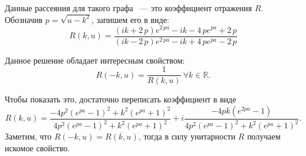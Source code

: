 \documentclass[a4 paper, 12 pt]{extarticle}
\begin{document}
   Данные рассеяния для такого графа ~--- это коэффициент отражения $R$. Обозначив $p=\sqrt{u-k^2}$, запишем его в виде:
   \begin{equation}
   \label{OneDimensionalReflection}
   R\left(k,u\right) = {\frac { \left( ik+2\,p \right) {e}^{2\,pa}-ik-4\,p{e}^{pa}+2\,p}{ \left( ik-2\,p \right) {e}^{2\,pa}-ik+4\,p{e}^{pa}-2\,p}}
   \end{equation}
   
   Данное решение обладает интересным свойством: \[R\left(-k,u\right) = \frac{1}{R\left(k,u\right)} \ \forall k \in \mathbb{R}.\]
   
   Чтобы показать это, достаточно переписать коэффициент в виде
   \[ R\left(k,u\right) =
   \frac{-4p^2 \left(e^{pa}-1\right)^2 + k^2 \left(e^{pa}+1\right)^2}{4p^2 \left(e^{pa}-1\right)^2 + k^2 \left(e^{pa}+1\right)^2} + i \frac{-4pk\left(e^{2pa}-1\right)}{4p^2 \left(e^{pa}-1\right)^2 + k^2 \left(e^{pa}+1\right)^2}.\]
   Заметим, что $R\left(-k,u\right) = \overline{R\left(k,u\right)}$, тогда в силу унитарности $R$ получаем искомое свойство.  

  
   
\end{document}
